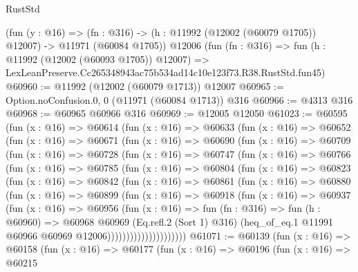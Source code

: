 \begin{lexlean}{RustStd}
\begin{coremodule}
    (fun (y : @16) =>
    (fn : @316) -> (h : @11992 (@12002 (@60079 @1705)) @12007) -> @11971 (@60084 @1705))
    @12006
    (fun (fn : @316) =>
    fun (h : @11992 (@12002 (@60093 @1705)) @12007) =>
    LexLeanPreserve.Cc265348943ac75b534ad14c10e123f73.R38.RustStd.fun45)
@60960 := @11992 (@12002 (@60079 @1713)) @12007
@60965 := Option.noConfusion.{0, 0} (@11971 (@60084 @1713)) @316
@60966 := @4313 @316
@60968 := @60965 @60966 @316
@60969 := @12005 @12050
@61023 := @60595
    (fun (x : @16) =>
    @60614
      (fun (x : @16) =>
      @60633
        (fun (x : @16) =>
        @60652
          (fun (x : @16) =>
          @60671
            (fun (x : @16) =>
            @60690
              (fun (x : @16) =>
              @60709
                (fun (x : @16) =>
                @60728
                  (fun (x : @16) =>
                  @60747
                    (fun (x : @16) =>
                    @60766
                      (fun (x : @16) =>
                      @60785
                        (fun (x : @16) =>
                        @60804
                          (fun (x : @16) =>
                          @60823
                            (fun (x : @16) =>
                            @60842
                              (fun (x : @16) =>
                              @60861
                                (fun (x : @16) =>
                                @60880
                                  (fun (x : @16) =>
                                  @60899
                                    (fun (x : @16) =>
                                    @60918
                                      (fun (x : @16) =>
                                      @60937
                                        (fun (x : @16) =>
                                        @60956
                                          (fun (x : @16) =>
                                          fun (fn : @316) =>
                                          fun (h : @60960) =>
                                          @60968
                                            @60969
                                            (Eq.refl.{2} (Sort 1) @316)
                                            (heq_of_eq.{1}
                                              @11991
                                              @60966
                                              @60969
                                              @12006)))))))))))))))))))))
@61071 := @60139
    (fun (x : @16) =>
    @60158
      (fun (x : @16) =>
      @60177
        (fun (x : @16) =>
        @60196
          (fun (x : @16) =>
          @60215

\end{coremodule}
\end{lexlean}

